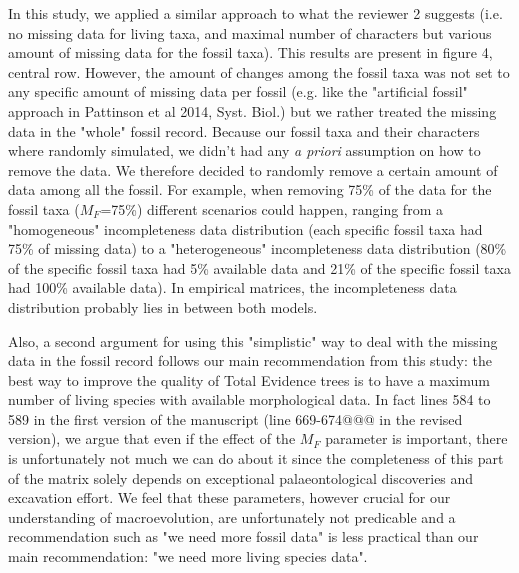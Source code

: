 \documentclass[12pt,letterpaper]{article}
\begin{document}
\begin{enumerate}
In this study, we applied a similar approach to what the reviewer 2 suggests (i.e. no missing data for living taxa, and maximal number of characters but various amount of missing data for the fossil taxa).
This results are present in figure 4, central row.
However, the amount of changes among the fossil taxa was not set to any specific amount of missing data per fossil (e.g. like the "artificial fossil" approach in Pattinson et al 2014, Syst. Biol.) but we rather treated the missing data in the "whole" fossil record.
Because our fossil taxa and their characters where randomly simulated, we didn't had any \textit{a priori} assumption on how to remove the data.
We therefore decided to randomly remove a certain amount of data among all the fossil.
For example, when removing 75\% of the data for the fossil taxa ($M_F$=75\%) different scenarios could happen, ranging from a "homogeneous" incompleteness data distribution (each specific fossil taxa had 75\% of missing data) to a "heterogeneous" incompleteness data distribution  (80\% of the specific fossil taxa had 5\% available data and 21\% of the specific fossil taxa had 100\% available data).
In empirical matrices, the incompleteness data distribution probably lies in between both models.

Also, a second argument for using this "simplistic" way to deal with the missing data in the fossil record follows our main recommendation from this study: the best way to improve the quality of Total Evidence trees is to have a maximum number of living species with available morphological data.
In fact lines 584 to 589 in the first version of the manuscript (line 669-674@@@ in the revised version), we argue that even if the effect of the $M_F$ parameter is important, there is unfortunately not much we can do about it since the completeness of this part of the matrix solely depends on exceptional palaeontological discoveries and excavation effort.
We feel that these parameters, however crucial for our understanding of macroevolution, are unfortunately not predicable and a recommendation such as "we need more fossil data" is less practical than our main recommendation: "we need more living species data".

\end{enumerate}
\end{document}
